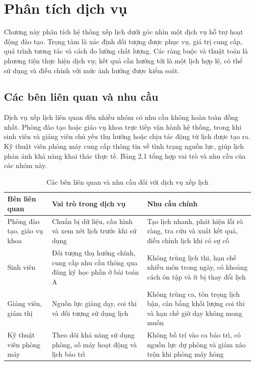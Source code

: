 
\chapter{Phân tích dịch vụ}
\label{ch:phan-tich-dich-vu}

Chương này phân tích hệ thống xếp lịch dưới góc nhìn một dịch vụ hỗ trợ hoạt động đào tạo. Trọng tâm là xác định đối tượng được phục vụ, giá trị cung cấp, quá trình tương tác và cách đo lường chất lượng. Các ràng buộc và thuật toán là phương tiện thực hiện dịch vụ; kết quả cần hướng tới là một lịch hợp lệ, có thể sử dụng và điều chỉnh với mức ảnh hưởng được kiểm soát.

\section{Các bên liên quan và nhu cầu}
\label{sec:ben-lien-quan}

Dịch vụ xếp lịch liên quan đến nhiều nhóm có nhu cầu không hoàn toàn đồng nhất. Phòng đào tạo hoặc giáo vụ khoa trực tiếp vận hành hệ thống, trong khi sinh viên và giảng viên chủ yếu thụ hưởng hoặc chịu tác động từ lịch được tạo ra. Kỹ thuật viên phòng máy cung cấp thông tin về tình trạng nguồn lực, giúp lịch phản ánh khả năng khai thác thực tế. Bảng 2.1 tổng hợp vai trò và nhu cầu của các nhóm này.

\begin{table}[htbp]
    \centering
    \caption{Các bên liên quan và nhu cầu đối với dịch vụ xếp lịch}
    \label{tab:ben-lien-quan}
    \small
    \begin{tabularx}{\textwidth}{@{}p{}XX@{}}
        \toprule
        Bên liên quan & Vai trò trong dịch vụ & Nhu cầu chính \\
        \midrule
        Phòng đào tạo, giáo vụ khoa & Chuẩn bị dữ liệu, cấu hình và xem xét lịch trước khi sử dụng & Tạo lịch nhanh, phát hiện lỗi rõ ràng, tra cứu và xuất kết quả, điều chỉnh lịch khi có sự cố \\
        \addlinespace
        Sinh viên & Đối tượng thụ hưởng chính, cung cấp nhu cầu thông qua đăng ký học phần ở bài toán A & Không trùng lịch thi, hạn chế nhiều môn trong ngày, có khoảng cách ôn tập và ít bị thay đổi lịch \\
        \addlinespace
        Giảng viên, giám thị & Nguồn lực giảng dạy, coi thi và đối tượng sử dụng lịch & Không trùng ca, tôn trọng lịch bận, cân bằng khối lượng coi thi và hạn chế giờ dạy không mong muốn \\
        \addlinespace
        Kỹ thuật viên phòng máy & Theo dõi khả năng sử dụng phòng, số máy hoạt động và lịch bảo trì & Không bố trí vào ca bảo trì, có nguồn lực dự phòng và giảm xáo trộn khi phòng máy hỏng \\
        \bottomrule
    \end{tabularx}
\end{table}

